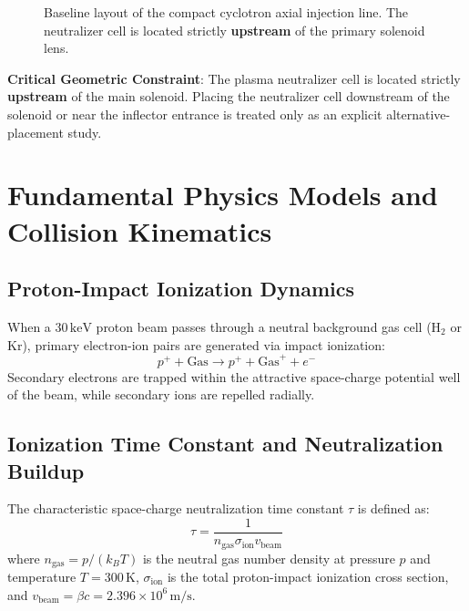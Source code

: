 \documentclass[11pt,a4paper]{article}
\begin{document}
\begin{figure}[h!]
\centering
{}
\caption{Baseline layout of the compact cyclotron axial injection line. The neutralizer cell is located strictly \textbf{upstream} of the primary solenoid lens.}
\label{fig:layout}
\end{figure}

\textbf{Critical Geometric Constraint}: The plasma neutralizer cell is located strictly \textbf{upstream} of the main solenoid. Placing the neutralizer cell downstream of the solenoid or near the inflector entrance is treated only as an explicit alternative-placement study.

\section{Fundamental Physics Models and Collision Kinematics}

\subsection{Proton-Impact Ionization Dynamics}
When a $30\,\text{keV}$ proton beam passes through a neutral background gas cell ($\text{H}_2$ or $\text{Kr}$), primary electron-ion pairs are generated via impact ionization:
\begin{equation}
p^+ + \text{Gas} \longrightarrow p^+ + \text{Gas}^+ + e^-
\end{equation}
Secondary electrons are trapped within the attractive space-charge potential well of the beam, while secondary ions are repelled radially.

\subsection{Ionization Time Constant and Neutralization Buildup}
The characteristic space-charge neutralization time constant $\tau$ is defined as:
\begin{equation}
\tau = \frac{1}{n_{\text{gas}} \sigma_{\text{ion}} v_{\text{beam}}}
\end{equation}
where $n_{\text{gas}} = p / (k_B T)$ is the neutral gas number density at pressure $p$ and temperature $T = 300\,\text{K}$, $\sigma_{\text{ion}}$ is the total proton-impact ionization cross section, and $v_{\text{beam}} = \beta c = 2.396 \times 10^6\,\text{m/s}$.
\end{document}
